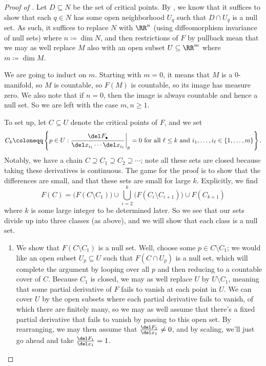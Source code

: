 \documentclass[../notes.tex]{subfiles}
\begin{document}
\begin{proof}[Proof of ]
	Let $D\subseteq N$ be the set of critical points. By , we know that it suffices to show that each $q\in N$ has some open neighborhood $U_q$ such that $D\cap U_q$ is a null set. As such, it suffices to replace $N$ with $\RR^n$ (using diffeomorphism invariance of null sets) where $n\coloneqq\dim N$, and then restrictions of $F$ by pullback mean that we may as well replace $M$ also with an open subset $U\subseteq\RR^m$ where $m\coloneqq\dim M$.

	We are going to induct on $m$. Starting with $m=0$, it means that $M$ is a $0$-manifold, so $M$ is countable, so $F(M)$ is countable, so its image has measure zero. We also note that if $n=0$, then the image is always countable and hence a null set. So we are left with the case $m,n\ge1$.

	To set up, let $C\subseteq U$ denote the critical points of $F$, and we set
	\[C_k\coloneqq\left\{p\in U:\frac{\del F_\bullet}{\del x_{i_1}\cdots\del x_{i_\ell}}\bigg|_p=0\text{ for all }\ell\le k\text{ and }i_1,\ldots,i_\ell\in\{1,\ldots,m\}\right\}.\]
	Notably, we have a chain $C\supseteq C_1\supseteq C_2\supseteq\cdots$; note all these sets are closed because taking these derivatives is continuous. The game for the proof is to show that the differences are small, and that these sets are small for large $k$. Explicitly, we find
	\[F(C)=\big(F(C\setminus C_1)\big)\cup\bigcup_{i=2}^k\big(F(C_i\setminus C_{i+1})\big)\cup F(C_{k+1})\]
	where $k$ is some large integer to be determined later. So we see that our sets divide up into three classes (as above), and we will show that each class is a null set.
	\begin{enumerate}
		\item We show that $F(C\setminus C_1)$ is a null set. Well, choose some $p\in C\setminus C_1$; we would like an open subset $U_p\subseteq U$ such that $F(C\cap U_p)$ is a null set, which will complete the argument by looping over all $p$ and then reducing to a countable cover of $C$. Because $C_1$ is closed, we may as well replace $U$ by $U\setminus C_1$, meaning that some partial derivative of $F$ fails to vanish at each point in $U$. We can cover $U$ by the open subsets where each partial derivative fails to vanish, of which there are finitely many, so we may as well assume that there's a fixed partial derivative that fails to vanish by passing to this open set. By rearranging, we may then assume that $\frac{\del F_1}{\del x_1}\ne0$, and by scaling, we'll just go ahead and take $\frac{\del F_1}{\del x_1}=1$.


\end{enumerate}
\end{proof}
\end{document}
